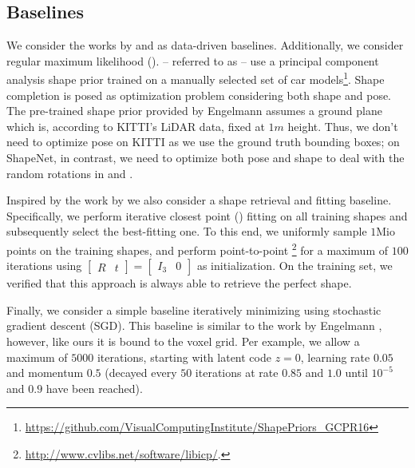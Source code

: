 \subsection{Baselines}
\label{sec:baselines}



%
{We consider the works by \cite{Engelmann2016GCPR} and \cite{Gupta2015CVPR} as data-driven baselines. Additionally, we consider regular maximum likelihood (\ML). \cite{Engelmann2016GCPR} -- referred to as \Engelmann\xspace-- use a principal component analysis shape prior trained on a manually selected set of car models\footnote{\url{https://github.com/VisualComputingInstitute/ShapePriors_GCPR16}}. Shape completion is posed as optimization problem considering both shape and pose. The pre-trained shape prior provided by Engelmann \etal assumes a ground plane which is, according to KITTI's LiDAR data, fixed at $1m$ height. Thus, we don't need to optimize pose on KITTI as we use the ground truth bounding boxes; on ShapeNet, in contrast, we need to optimize both pose and shape to deal with the random rotations in \clean and \noisy.}

Inspired by the work by \cite{Gupta2015CVPR} we also consider a shape retrieval and fitting baseline. Specifically, we perform iterative closest point (\ICP) \citep{Besl1992PAMI} fitting on all training shapes and subsequently select the best-fitting one. To this end, we uniformly sample $1\text{Mio}$ points on the training shapes, and perform point-to-point \ICP\footnote{\url{http://www.cvlibs.net/software/libicp/}.} for a maximum of $100$ iterations using $\left[\begin{matrix}R & t\end{matrix}\right] = \left[\begin{matrix}I_3 & 0\end{matrix}\right]$ as initialization. On the training set, we verified that this approach is always able to retrieve the perfect shape.

Finally, we consider a simple \ML baseline iteratively minimizing  using stochastic gradient descent (SGD). This baseline is similar to the work by Engelmann \etal, however, like ours it is bound to the voxel grid. Per example, we allow a maximum of $5000$ iterations, starting with latent code $z = 0$, learning rate $0.05$ and momentum $0.5$ (decayed every $50$ iterations at rate $0.85$ and $1.0$ until $10^{-5}$ and $0.9$ have been reached).

